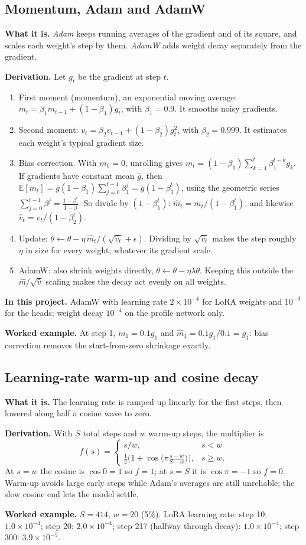 \documentclass[10pt,a4paper]{article}
\newcommand{\what}[1]{\par\textbf{What it is.} #1}
\newcommand{\here}[1]{\par\textbf{In this project.} #1}
\newcommand{\deriv}{\par\textbf{Derivation.} }
\newcommand{\ex}{\par\textbf{Worked example.} }
\begin{document}
\subsection{Momentum, Adam and AdamW}\label{sec:adam}
\what{\emph{Adam} keeps running averages of the gradient and of its square, and scales each weight's step by them. \emph{AdamW} adds weight decay separately from the gradient.}
\deriv Let $g_t$ be the gradient at step $t$.
\begin{enumerate}
\item First moment (momentum), an exponential moving average: $m_t=\beta_1m_{t-1}+(1-\beta_1)g_t$, with $\beta_1=0.9$. It smooths noisy gradients.
\item Second moment: $v_t=\beta_2v_{t-1}+(1-\beta_2)g_t^2$, with $\beta_2=0.999$. It estimates each weight's typical gradient size.
\item Bias correction. With $m_0=0$, unrolling gives $m_t=(1-\beta_1)\sum_{k=1}^t\beta_1^{t-k}g_k$. If gradients have constant mean $\bar g$, then $\mathbb{E}[m_t]=\bar g(1-\beta_1)\sum_{j=0}^{t-1}\beta_1^{j}=\bar g(1-\beta_1^t)$, using the geometric series $\sum_{j=0}^{t-1}\beta^j=\frac{1-\beta^t}{1-\beta}$. So divide by $(1-\beta_1^t)$: $\hat m_t=m_t/(1-\beta_1^t)$, and likewise $\hat v_t=v_t/(1-\beta_2^t)$.
\item Update: $\theta\leftarrow\theta-\eta\,\hat m_t/(\sqrt{\hat v_t}+\epsilon)$. Dividing by $\sqrt{\hat v_t}$ makes the step roughly $\eta$ in size for every weight, whatever its gradient scale.
\item AdamW: also shrink weights directly, $\theta\leftarrow\theta-\eta\lambda\theta$. Keeping this outside the $\hat m/\sqrt{\hat v}$ scaling makes the decay act evenly on all weights.
\end{enumerate}
\here{AdamW with learning rate $2\times10^{-4}$ for LoRA weights and $10^{-3}$ for the heads; weight decay $10^{-4}$ on the profile network only.}
\ex At step 1, $m_1=0.1g_1$ and $\hat m_1=0.1g_1/0.1=g_1$: bias correction removes the start-from-zero shrinkage exactly.

\subsection{Learning-rate warm-up and cosine decay}
\what{The learning rate is ramped up linearly for the first steps, then lowered along half a cosine wave to zero.}
\deriv With $S$ total steps and $w$ warm-up steps, the multiplier is
\[f(s)=\begin{cases}s/w,& s<w\\ \tfrac12\Big(1+\cos\big(\pi\tfrac{s-w}{S-w}\big)\Big),& s\ge w.\end{cases}\]
At $s=w$ the cosine is $\cos0=1$ so $f=1$; at $s=S$ it is $\cos\pi=-1$ so $f=0$. Warm-up avoids large early steps while Adam's averages are still unreliable; the slow cosine end lets the model settle.
\ex $S=414$, $w=20$ (5\%). LoRA learning rate: step 10: $1.0\times10^{-4}$; step 20: $2.0\times10^{-4}$; step 217 (halfway through decay): $1.0\times10^{-4}$; step 300: $3.9\times10^{-5}$.
\end{document}
